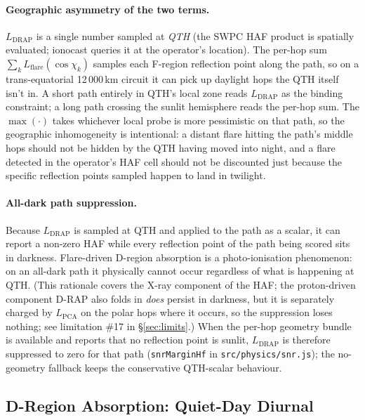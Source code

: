 \documentclass[11pt,a4paper]{article}
\begin{document}
\paragraph{Geographic asymmetry of the two terms.}  $L_{\text{DRAP}}$
is a single number sampled at \emph{QTH} (the SWPC HAF product is
spatially evaluated; ionocast queries it at the operator's
location).  The per-hop sum $\sum_k L_{\text{flare}}(\cos\chi_k)$
samples each F-region reflection point along the path, so on a
trans-equatorial 12\,000\,km circuit it can pick up daylight hops
the QTH itself isn't in.  A short path entirely in QTH's local
zone reads $L_{\text{DRAP}}$ as the binding constraint; a long path
crossing the sunlit hemisphere reads the per-hop sum.  The
$\max(\cdot)$ takes whichever local probe is more pessimistic on
that path, so the geographic inhomogeneity is intentional: a
distant flare hitting the path's middle hops should not be hidden
by the QTH having moved into night, and a flare detected in the
operator's HAF cell should not be discounted just because the
specific reflection points sampled happen to land in twilight.

\paragraph{All-dark path suppression.}  Because $L_{\text{DRAP}}$
is sampled at QTH and applied to the path as a scalar, it can
report a non-zero HAF while every reflection point of the path
being scored sits in darkness.  Flare-driven D-region absorption
is a photo-ionisation phenomenon: on an all-dark path it
physically cannot occur regardless of what is happening at QTH.
(This rationale covers the X-ray component of the HAF; the
proton-driven component D-RAP also folds in \emph{does} persist
in darkness, but it is separately charged by $L_{\text{PCA}}$ on
the polar hops where it occurs, so the suppression loses nothing;
see limitation \#17 in \S\ref{sec:limits}.)
When the per-hop geometry bundle is available and reports that no
reflection point is sunlit, $L_{\text{DRAP}}$ is therefore
suppressed to zero for that path (\texttt{snrMarginHf} in
\texttt{src/physics/snr.js}); the no-geometry fallback
keeps the conservative QTH-scalar behaviour.

\subsection{D-Region Absorption: Quiet-Day Diurnal}\label{sec:labsd}
\end{document}
